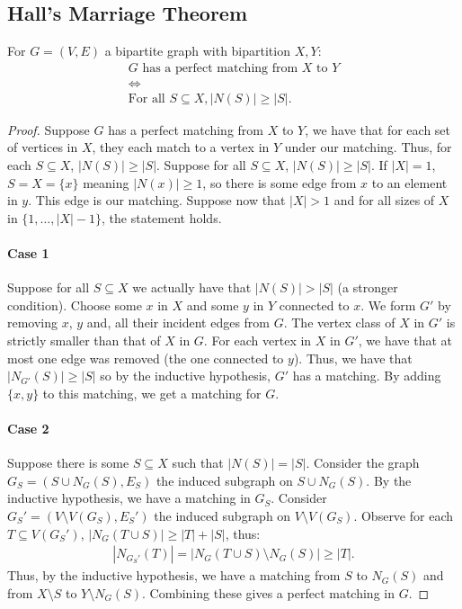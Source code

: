\newpage

\subsection{Hall's Marriage Theorem}

For $G = (V, E)$ a bipartite graph with bipartition $X, Y$: \begin{gather*}
  G \text{ has a perfect matching from } X \text{ to } Y \\
  \Longleftrightarrow \\
  \text{For all } S \subseteq X, |N(S)| \geq |S|.
\end{gather*}
\begin{proof}
  Suppose $G$ has a perfect matching from $X$ to $Y$, we have that
  for each set of vertices in $X$, they each match to a
  vertex in $Y$ under our matching. Thus, for each $S \subseteq X$,
  $|N(S)| \geq |S|$. Suppose for all $S \subseteq X$, 
  $|N(S)| \geq |S|$. If $|X| = 1$, $S = X = \{x\}$ meaning
  $|N(x)| \geq 1$, so there is some edge from $x$ to an
  element in $y$. This edge is our matching.
  Suppose now that $|X| > 1$ and for all sizes of $X$ in
  $\{1, \ldots, |X| - 1\}$, the statement holds.
  \paragraph{Case 1}
  Suppose for all $S \subseteq X$ we actually have that 
  $|N(S)| > |S|$ (a stronger condition). Choose some
  $x$ in $X$ and some $y$ in $Y$ connected to $x$. We
  form $G'$ by removing $x$, $y$ and, all their incident
  edges from $G$. The vertex class of $X$ in $G'$
  is strictly smaller than that of $X$ in $G$. For
  each vertex in $X$ in $G'$, we have that at most
  one edge was removed (the one connected to $y$).
  Thus, we have that $|N_{G'}(S)| \geq |S|$ so by the
  inductive hypothesis, $G'$ has a matching. By adding
  $\{x, y\}$ to this matching, we get a matching for $G$.
  \paragraph{Case 2}
  Suppose there is some $S \subseteq X$ such that $|N(S)| = |S|$.
  Consider the graph $G_S = (S \cup N_G(S), E_S)$ the induced
  subgraph on $S \cup N_G(S)$. By the inductive hypothesis,
  we have a matching in $G_S$. Consider 
  $G_S' = (V \setminus V(G_S), E_S')$ the induced subgraph on
  $V \setminus V(G_S)$. Observe for each $T \subseteq V(G_S')$,
  $|N_G(T \cup S)| \geq |T| + |S|$, thus: \begin{gather*}
      |N_{G_S'}(T)| = |N_G(T \cup S) \setminus N_G(S)| \geq |T|.
  \end{gather*} Thus, by the inductive hypothesis, we have a matching
  from $S$ to $N_G(S)$ and from $X \setminus S$ to $Y \setminus N_G(S)$.
  Combining these gives a perfect matching in $G$. 
\end{proof}